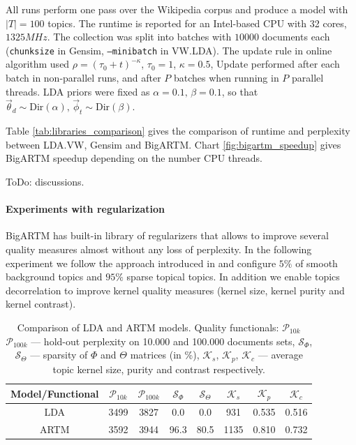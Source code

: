 \documentclass[russian]{llncs}
\begin{document}
All runs perform one pass over the Wikipedia corpus and produce a model with $|T|=100$ topics.
The runtime is reported for an Intel-based CPU with 32 cores, $1325 MHz$.
The collection was split into batches with $10 000$ documents each
(\texttt{chunksize} in Gensim, \texttt{--minibatch} in VW.LDA).
The update rule in online algorithm used $\rho = (\tau_0 + t)^{-\kappa}$, $\tau_0 = 1$, $\kappa = 0.5$,
Update performed after each batch in non-parallel runs, and after $P$ batches when running in $P$ parallel threads.
LDA priors were fixed as $\alpha = 0.1,\, \beta = 0.1$, so that $\vec{\theta}_d \sim \text{Dir}(\alpha),\, \vec{\phi}_t \sim \text{Dir}(\beta)$.

Table \ref{tab:libraries_comparison} gives the comparison of runtime and perplexity between LDA.VW, Gensim and BigARTM.
Chart \ref{fig:bigartm_speedup} gives BigARTM speedup depending on the number CPU threads.

{\color{red}ToDo: discussions.}

\paragraph{Experiments with regularization}

BigARTM has built-in library of regularizers that allows to improve several quality measures almost without any loss of perplexity.
In the following experiment we follow the approach introduced in \cite{voron14aist} and configure $5\%$ of smooth background topics 
and $95\%$ sparse topical topics. In addition we enable topics decorrelation to improve kernel quality measures
(kernel size, kernel purity and kernel contrast).
    
\begin{table}[t]
\centering
\begin{tabular}[t]{||c||ccccccc||}
\hline
Model/Functional & $\mathcal{P}_{10k}$ & $\mathcal{P}_{100k}$ &  $\mathcal{S}_{\Phi}$ & $\mathcal{S}_{\Theta}$ &  $\mathcal{K}_{s}$ & $\mathcal{K}_{p}$ &  $\mathcal{K}_{c}$ \\
\hline
LDA              & 3499 & 3827 & 0.0  & 0.0  & 931  & 0.535 & 0.516 \\
ARTM             & 3592 & 3944 & 96.3 & 80.5 & 1135 & 0.810 & 0.732 \\
\hline
\end{tabular}
\caption{Comparison of LDA and ARTM models. 
Quality functionals: $\mathcal{P}_{10k}$ $\mathcal{P}_{100k}$ --- hold-out perplexity on 10.000 and 100.000 documents sets,
$\mathcal{S}_{\Phi}$, $\mathcal{S}_{\Theta}$ --- sparsity of $\Phi$ and $\Theta$ matrices (in \%),
$\mathcal{K}_{s}$, $\mathcal{K}_{p}$, $\mathcal{K}_{c}$ --- average topic kernel size, purity and contrast respectively.}
\label{tab:model_comparison}
\end{table}
\end{document}
